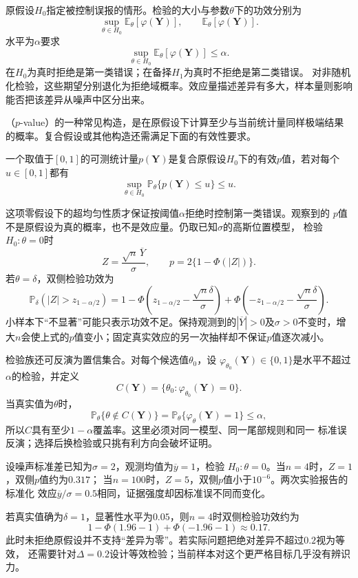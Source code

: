 原假设\(H_0\)指定被控制误报的情形。检验的大小与参数\(\theta\)下的功效分别为
\[
  \sup_{\theta\in H_0}\mathbb{E}_\theta[\varphi(\bm Y)],
  \qquad
  \mathbb{E}_\theta[\varphi(\bm Y)].
\]
水平为\(\alpha\)要求
\[
  \sup_{\theta\in H_0}
  \mathbb{E}_\theta[\varphi(\bm Y)]
  \leq\alpha.
\]
在\(H_0\)为真时拒绝是第一类错误；在备择\(H_1\)为真时不拒绝是第二类错误。
对非随机化检验，这些期望分别退化为拒绝域概率。效应量描述差异有多大，样本量则影响
能否把该差异从噪声中区分出来。

（\(p\)-value）的一种常见构造，是在原假设下计算至少与当前统计量同样极端结果的概率。复合假设或其他构造还需满足下面的有效性要求。
\begin{definition}[有效p值]
  \label{def:statistics-valid-p-value}
  一个取值于\([0,1]\)的可测统计量\(p(\bm Y)\)是复合原假设\(H_0\)下的有效\(p\)值，若对每个
\(u\in[0,1]\)都有
\[
  \sup_{\theta\in H_0}\mathbb{P}_\theta\{p(\bm Y)\leq u\}\leq u.
\]
\end{definition}
这项零假设下的超均匀性质才保证按阈值\(\alpha\)拒绝时控制第一类错误。观察到的
\(p\)值不是原假设为真的概率，也不是效应量。仍取已知\(\sigma\)的高斯位置模型，
检验\(H_0:\theta=0\)时
\[
  Z=\frac{\sqrt n\,\overline Y}{\sigma},\qquad
  p=2\{1-\Phi(|Z|)\}.
\]
若\(\theta=\delta\)，双侧检验功效为
\[
  \mathbb{P}_\delta(|Z|>z_{1-\alpha/2})
  =
  1-\Phi\left(z_{1-\alpha/2}-\frac{\sqrt n\delta}{\sigma}\right)
  +\Phi\left(-z_{1-\alpha/2}-\frac{\sqrt n\delta}{\sigma}\right).
\]
小样本下“不显著”可能只表示功效不足。保持观测到的\(|\overline Y|>0\)及\(\sigma>0\)不变时，增大\(n\)会使上式的\(p\)值变小；固定真实效应的另一次抽样却不保证\(p\)值逐次减小。

检验族还可反演为置信集合。对每个候选值\(\theta_0\)，设
\(\varphi_{\theta_0}(\bm Y)\in\{0,1\}\)是水平不超过\(\alpha\)的检验，并定义
\[
  C(\bm Y)=\{\theta_0:\varphi_{\theta_0}(\bm Y)=0\}.
\]
当真实值为\(\theta\)时，
\[
  \mathbb{P}_\theta\{\theta\notin C(\bm Y)\}
  =\mathbb{P}_\theta\{\varphi_\theta(\bm Y)=1\}\leq\alpha,
\]
所以\(C\)具有至少\(1-\alpha\)覆盖率。这里必须对同一模型、同一尾部规则和同一
标准误反演；选择后换检验或只挑有利方向会破坏证明。

\begin{example}[同一效应量下的证据与功效]
\label{ex:statistics-evidence-power-same-effect}
设噪声标准差已知为\(\sigma=2\)，观测均值为\(\overline y=1\)，检验
\(H_0:\theta=0\)。当\(n=4\)时，\(Z=1\)，双侧\(p\)值约为\(0.317\)；
当\(n=100\)时，\(Z=5\)，双侧\(p\)值小于\(10^{-6}\)。两次实验报告的标准化
效应\(\overline y/\sigma=0.5\)相同，证据强度却因标准误不同而变化。

若真实值确为\(\delta=1\)，显著性水平为\(0.05\)，则\(n=4\)时双侧检验功效约为
\[
  1-\Phi(1.96-1)+\Phi(-1.96-1)\approx0.17.
\]
此时未拒绝原假设并不支持“差异为零”。若实际问题把绝对差异不超过\(0.2\)视为等效，
还需要针对\(\Delta=0.2\)设计等效检验；当前样本对这个更严格目标几乎没有辨识力。
\end{example}

